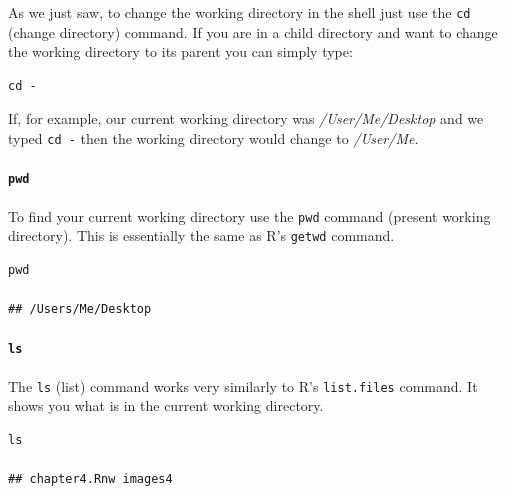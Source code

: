 \documentclass[krantz1]{krantz}
\begin{document}
As we just saw, to change the working directory in the shell just use the {\tt{cd}} (change directory) command. If you are in a child directory and want to change the working directory to its parent you can simply type:

\begin{knitrout}
\color{fgcolor}\begin{kframe}
\begin{verbatim}
cd -
\end{verbatim}
\end{kframe}
\end{knitrout}


\noindent If, for example, our current working directory was \emph{/User/Me/Desktop} and we typed \texttt{cd -} then the working directory would change to \emph{/User/Me}.

\paragraph{{\tt{pwd}}}

To find your current working directory use the \texttt{pwd} command (present working directory). This is essentially the same as R's \texttt{getwd} command.

\begin{knitrout}
\color{fgcolor}\begin{kframe}
\begin{verbatim}
pwd

## /Users/Me/Desktop
\end{verbatim}
\end{kframe}
\end{knitrout}


\paragraph{{\tt{ls}}}

The \texttt{ls} (list) command works very similarly to R's \texttt{list.files} command. It shows you what is in the current working directory.

\begin{knitrout}
\color{fgcolor}\begin{kframe}
\begin{verbatim}
ls

## chapter4.Rnw images4
\end{verbatim}
\end{kframe}
\end{knitrout}
\end{document}
